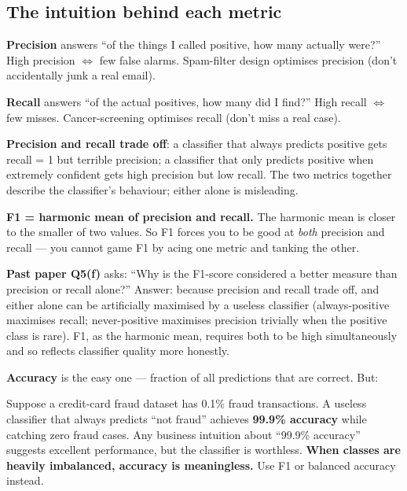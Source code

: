 \documentclass[11pt, a4paper]{article}
\begin{document}
\subsection{The intuition behind each metric}

\textbf{Precision} answers ``of the things I called positive, how many actually were?'' High precision $\Leftrightarrow$ few false alarms. Spam-filter design optimises precision (don't accidentally junk a real email).

\textbf{Recall} answers ``of the actual positives, how many did I find?'' High recall $\Leftrightarrow$ few misses. Cancer-screening optimises recall (don't miss a real case).

\textbf{Precision and recall trade off}: a classifier that always predicts positive gets recall = 1 but terrible precision; a classifier that only predicts positive when extremely confident gets high precision but low recall. The two metrics together describe the classifier's behaviour; either alone is misleading.

\textbf{F1 = harmonic mean of precision and recall.} The harmonic mean is closer to the smaller of two values. So F1 forces you to be good at \emph{both} precision and recall — you cannot game F1 by acing one metric and tanking the other.

\begin{notebox}
\textbf{Past paper Q5(f)} asks: ``Why is the F1-score considered a better measure than precision or recall alone?'' Answer: because precision and recall trade off, and either alone can be artificially maximised by a useless classifier (always-positive maximises recall; never-positive maximises precision trivially when the positive class is rare). F1, as the harmonic mean, requires both to be high simultaneously and so reflects classifier quality more honestly.
\end{notebox}

\textbf{Accuracy} is the easy one — fraction of all predictions that are correct. But:

\begin{pitfallbox}
Suppose a credit-card fraud dataset has 0.1\% fraud transactions. A useless classifier that always predicts ``not fraud'' achieves \textbf{99.9\% accuracy} while catching zero fraud cases. Any business intuition about ``99.9\% accuracy'' suggests excellent performance, but the classifier is worthless. \textbf{When classes are heavily imbalanced, accuracy is meaningless.} Use F1 or balanced accuracy instead.
\end{pitfallbox}
\end{document}
